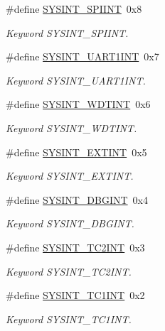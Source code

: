 \begin{DoxyCompactItemize}
\item 
\#define \mbox{\hyperlink{a00011_a2b01c4fb9d69c049d189fea4336e809c}{S\+Y\+S\+I\+N\+T\+\_\+\+S\+P\+I\+I\+NT}}~0x8
\begin{DoxyCompactList}\small\item\em Keyword S\+Y\+S\+I\+N\+T\+\_\+\+S\+P\+I\+I\+NT. \end{DoxyCompactList}\item 
\#define \mbox{\hyperlink{a00011_a7fe941b86cf5765bd92b867744aef26c}{S\+Y\+S\+I\+N\+T\+\_\+\+U\+A\+R\+T1\+I\+NT}}~0x7
\begin{DoxyCompactList}\small\item\em Keyword S\+Y\+S\+I\+N\+T\+\_\+\+U\+A\+R\+T1\+I\+NT. \end{DoxyCompactList}\item 
\#define \mbox{\hyperlink{a00011_af64d968502ca7ba62141dd55f5647730}{S\+Y\+S\+I\+N\+T\+\_\+\+W\+D\+T\+I\+NT}}~0x6
\begin{DoxyCompactList}\small\item\em Keyword S\+Y\+S\+I\+N\+T\+\_\+\+W\+D\+T\+I\+NT. \end{DoxyCompactList}\item 
\#define \mbox{\hyperlink{a00011_a76cdcef76b44ff2f2125afcf05158f00}{S\+Y\+S\+I\+N\+T\+\_\+\+E\+X\+T\+I\+NT}}~0x5
\begin{DoxyCompactList}\small\item\em Keyword S\+Y\+S\+I\+N\+T\+\_\+\+E\+X\+T\+I\+NT. \end{DoxyCompactList}\item 
\#define \mbox{\hyperlink{a00011_a9abec7bef84c5bc3310714d05e1138dc}{S\+Y\+S\+I\+N\+T\+\_\+\+D\+B\+G\+I\+NT}}~0x4
\begin{DoxyCompactList}\small\item\em Keyword S\+Y\+S\+I\+N\+T\+\_\+\+D\+B\+G\+I\+NT. \end{DoxyCompactList}\item 
\#define \mbox{\hyperlink{a00011_a6316f8987b7727eeeeb09e4d5d95db96}{S\+Y\+S\+I\+N\+T\+\_\+\+T\+C2\+I\+NT}}~0x3
\begin{DoxyCompactList}\small\item\em Keyword S\+Y\+S\+I\+N\+T\+\_\+\+T\+C2\+I\+NT. \end{DoxyCompactList}\item 
\#define \mbox{\hyperlink{a00011_aa93c611771ffd54f3f00da8b21ed36f2}{S\+Y\+S\+I\+N\+T\+\_\+\+T\+C1\+I\+NT}}~0x2
\begin{DoxyCompactList}\small\item\em Keyword S\+Y\+S\+I\+N\+T\+\_\+\+T\+C1\+I\+NT. \end{DoxyCompactList}\item 

\end{DoxyCompactItemize}
